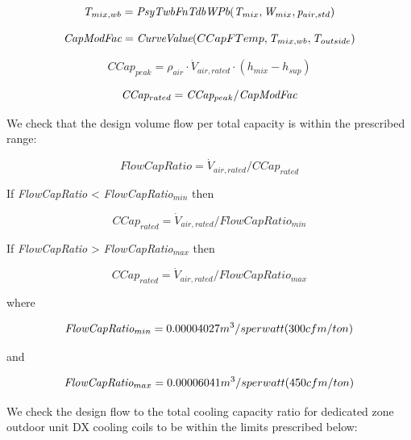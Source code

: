 \begin{equation}
\emph{T\(_{mix,wb}\)} = \emph{PsyTwbFnTdbWPb}(\emph{T\(_{mix}\)},\emph{W\(_{mix}\)}, \emph{p\(_{air,std}\)})
\end{equation}

\begin{equation}
\emph{CapModFac} = \emph{CurveValue}(CCapFTemp,\emph{T\(_{mix,wb}\)},\emph{T\(_{outside}\)})
\end{equation}

\begin{equation}
CCap_{peak} = \rho_{air} \cdot \dot V_{air,rated} \cdot (h_{mix} - h_{sup})
\end{equation}

\begin{equation}
\emph{CCap\(_{rated}\)} = \emph{CCap\(_{peak}\)}/ \emph{CapModFac}
\end{equation}

We check that the design volume flow per total capacity is within the prescribed range:

\begin{equation}
FlowCapRatio = \dot V_{air,rated} /CCap_{rated}
\end{equation}

If \emph{FlowCapRatio} \textless{} \emph{FlowCapRatio\(_{min}\)} then

\begin{equation}
CCap_{rated} = \dot V_{air,rated}/FlowCapRatio_{min}
\end{equation}

If \emph{FlowCapRatio} \textgreater{} \emph{FlowCapRatio\(_{max}\)} then

\begin{equation}
CCap_{rated} = \dot V_{air,rated} /FlowCapRatio_{max}
\end{equation}

where

\begin{equation}
\emph{FlowCapRatio\(_{min}\)} = 0.00004027 m^{3}/s per watt (300 cfm/ton)
\end{equation}

and

\begin{equation}
\emph{FlowCapRatio\(_{max}\)} = 0.00006041 m^{3}/s per watt (450 cfm/ton)
\end{equation}

We check the design flow to the total cooling capacity ratio for dedicated zone outdoor unit DX cooling coils to be within the limits prescribed below:

